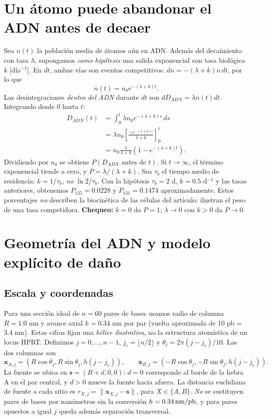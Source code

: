 \documentclass[11pt,a4paper]{article}
\begin{document}
\section{Un átomo puede abandonar el ADN antes de decaer}
Sea $n(t)$ la población media de átomos aún en ADN. Además del decaimiento con tasa $\lambda$, supongamos \emph{como hipótesis} una salida exponencial con tasa biológica $k$ [día$^{-1}$]. En $dt$, ambas vías son eventos competitivos: $dn=-(\lambda+k)n\,dt$, por lo que
\begin{equation}n(t)=n_0e^{-(\lambda+k)t}.\end{equation}
Las desintegraciones \emph{dentro del ADN} durante $dt$ son $dD_{ADN}=\lambda n(t)dt$. Integrando desde 0 hasta $t$:
\begin{align}
D_{ADN}(t)&=\int_0^t\lambda n_0e^{-(\lambda+k)s}\,ds\\
&=\lambda n_0\left[\frac{-e^{-(\lambda+k)s}}{\lambda+k}\right]_0^t\\
&=n_0\frac{\lambda}{\lambda+k}\left(1-e^{-(\lambda+k)t}\right).
\end{align}
Dividiendo por $n_0$ se obtiene $P(D_{ADN}\text{ antes de }t)$. Si $t\to\infty$, el término exponencial tiende a cero, y $P=\lambda/(\lambda+k)$. Sea $\tau_b$ el tiempo medio de residencia: $k=1/\tau_b$, \emph{no} $\ln2/\tau_b$. Con la hipótesis $\tau_b=2$ d, $k=0.5$ d$^{-1}$ y las tasas anteriores, obtenemos $P_{125}=0.0228$ y $P_{131}=0.1474$ aproximadamente. Estos porcentajes \emph{no} describen la biocinética de las células del artículo: ilustran el peso de una tasa competidora. \textbf{Chequeo:} $k=0$ da $P=1$; $\lambda\to0$ con $k>0$ da $P\to0$.

\section{Geometría del ADN y modelo explícito de daño}
\subsection{Escala y coordenadas}
Para una sección ideal de $n=60$ pares de bases usamos radio de columna $R=1.0$ nm y avance axial $h=0.34$ nm por par (vuelta aproximada de 10 pb = 3.4 nm). Estas cifras fijan una \emph{hélice ilustrativa}, no la estructura atomística de un locus HPRT. Definimos $j=0,\ldots,n-1$, $j_c=\lfloor n/2\rfloor$ y $\theta_j=2\pi(j-j_c)/10$. Las dos columnas son
\begin{equation}\mathbf x_{A,j}=(R\cos\theta_j,R\sin\theta_j,h(j-j_c)),\qquad
\mathbf x_{B,j}=(-R\cos\theta_j,-R\sin\theta_j,h(j-j_c)).\end{equation}
La fuente se ubica en $\mathbf s=(R+d,0,0)$: $d=0$ corresponde al borde de la hebra A en el par central, y $d>0$ mueve la fuente hacia afuera. La distancia euclidiana de fuente a cada sitio es $r_{X,j}=\|\mathbf x_{X,j}-\mathbf s\|$, para $X\in\{A,B\}$. \emph{No} se sustituyen pares de bases por nanómetros sin la conversión $h=0.34\,\mathrm{nm}/\mathrm{pb}$, y para pares opuestos a igual $j$ queda además separación transversal.
\end{document}
